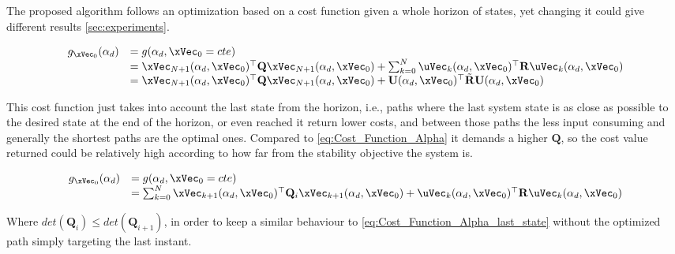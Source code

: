 The proposed algorithm follows an optimization based on a cost function given a whole horizon of states, yet changing it could give different results \ref{sec:experiments}. 

\begin{equation}
    \begin{array}{ll}
        g_{\xVec_0}(\alpha_d) &= g(\alpha_d, \xVec_0 = cte)  \\   
        &= \xVec_{N+1}(\alpha_d,\xVec_0)^{\top}\mathbf{Q}\xVec_{N+1}(\alpha_d,\xVec_0) + \sum_{k=0}^{N}  \uVec_k(\alpha_d,\xVec_0)^{\top}\mathbf{R}\uVec_k(\alpha_d,\xVec_0) \\
        &= \xVec_{N+1}(\alpha_d,\xVec_0)^{\top}\mathbf{Q}\xVec_{N+1}(\alpha_d,\xVec_0) +  \mathbf{U}(\alpha_d,\xVec_0)^{\top}\tilde{\mathbf{R}}\mathbf{U}(\alpha_d,\xVec_0)
    \end{array}
    \label{eq:Cost_Function_Alpha_last_state}
\end{equation}

This cost function just takes into account the last state from the horizon, i.e., paths where the last system state is as close as possible to the desired state at the end of the horizon, or even reached it return lower costs, and between those paths the less input consuming and generally the shortest paths are the optimal ones. Compared to \eqref{eq:Cost_Function_Alpha} it demands a higher \(\mathbf{Q}\), so the cost value returned could be relatively high according to how far from the stability objective the system is.


\begin{equation}
    \begin{array}{ll}
        g_{\xVec_0}(\alpha_d) &= g(\alpha_d, \xVec_0 = cte)  \\   
        &= \sum_{k=0}^{N} \xVec_{k+1}(\alpha_d,\xVec_0)^{\top}\mathbf{Q}_i\xVec_{k+1}(\alpha_d,\xVec_0) +  \uVec_k(\alpha_d,\xVec_0)^{\top}\mathbf{R}\uVec_k(\alpha_d,\xVec_0)
    \end{array}
    \label{eq:Cost_Function_Alpha_evol_state}
\end{equation}

Where \(det(\mathbf{Q}_i) \leq  det(\mathbf{Q}_{i+1})\), in order to keep a similar behaviour to \eqref{eq:Cost_Function_Alpha_last_state} without the optimized path simply targeting the last instant.

\subsection{}
\label{subsec:CLFs_Summed_Algorithm}



